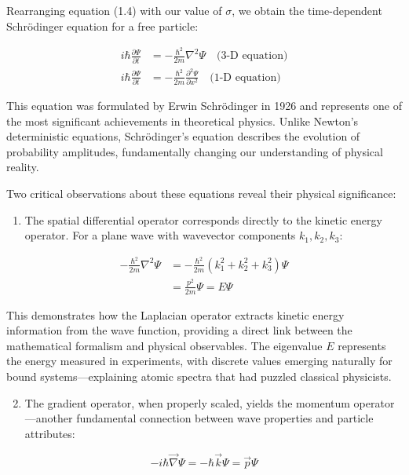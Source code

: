 \documentclass[italian]{HKNdocument}
\begin{document}
Rearranging equation (1.4) with our value of $\sigma$, we obtain the time-dependent Schrödinger equation for a free particle:

\begin{align*}
i \hbar \frac{\partial \Psi}{\partial t} & =-\frac{\hbar^{2}}{2 m} \nabla^{2} \Psi \quad \text{(3-D equation)} \\
i \hbar \frac{\partial \Psi}{\partial t} & =-\frac{\hbar^{2}}{2 m} \frac{\partial^{2} \Psi}{\partial x^{2}} \quad \text{(1-D equation)} \tag{1.7}
\end{align*}

This equation was formulated by Erwin Schrödinger in 1926 and represents one of the most significant achievements in theoretical physics. Unlike Newton's deterministic equations, Schrödinger's equation describes the evolution of probability amplitudes, fundamentally changing our understanding of physical reality.

Two critical observations about these equations reveal their physical significance:

\begin{enumerate}
  \item The spatial differential operator corresponds directly to the kinetic energy operator. For a plane wave with wavevector components $k_1, k_2, k_3$:
\end{enumerate}

\begin{align*}
-\frac{\hbar^{2}}{2 m} \nabla^{2} \Psi & =-\frac{\hbar^{2}}{2 m}\left(k_{1}^{2}+k_{2}^{2}+k_{3}^{2}\right) \Psi  \tag{1.8}\\
& =\frac{p^{2}}{2 m} \Psi=E \Psi
\end{align*}

This demonstrates how the Laplacian operator extracts kinetic energy information from the wave function, providing a direct link between the mathematical formalism and physical observables. The eigenvalue $E$ represents the energy measured in experiments, with discrete values emerging naturally for bound systems—explaining atomic spectra that had puzzled classical physicists.


\begin{enumerate}
  \setcounter{enumi}{1}
  \item The gradient operator, when properly scaled, yields the momentum operator—another fundamental connection between wave properties and particle attributes:
\end{enumerate}

\begin{equation*}
-i \hbar \vec{\nabla} \Psi=-\hbar \vec{k} \Psi=\vec{p} \Psi \tag{1.9}
\end{equation*}
\end{document}
